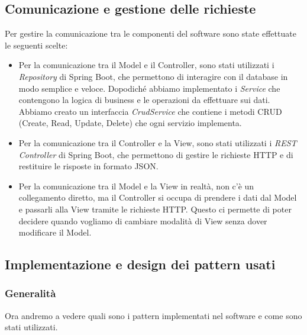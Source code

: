 \documentclass[a4paper]{article}
\begin{document}
\subsection{Comunicazione e gestione delle richieste}

Per gestire la comunicazione tra le componenti del software sono state effettuate le seguenti scelte:
\begin{itemize}
  \item Per la comunicazione tra il Model e il Controller, sono stati utilizzati i \textit{Repository} di Spring Boot, 
  che permettono di interagire con il database in modo semplice e veloce. Dopodiché abbiamo implementato
  i \textit{Service} che contengono la logica di business e le operazioni da effettuare sui dati. Abbiamo creato
  un interfaccia \textit{CrudService} che contiene i metodi CRUD (Create, Read, Update, Delete) che ogni servizio implementa.
  \item Per la comunicazione tra il Controller e la View, sono stati utilizzati i \textit{REST Controller} di Spring Boot, 
  che permettono di gestire le richieste HTTP e di restituire le risposte in formato JSON.
  \item Per la comunicazione tra il Model e la View in realtà, non c'è un collegamento diretto, ma il Controller
  si occupa di prendere i dati dal Model e passarli alla View tramite le richieste HTTP. Questo ci permette 
  di poter decidere quando vogliamo di cambiare modalità di View senza dover modificare il Model.
\end{itemize}

\subsection{Implementazione e design dei pattern usati}

\subsubsection{Generalità}

Ora andremo a vedere quali sono i pattern implementati nel software e come sono stati utilizzati.
\end{document}
